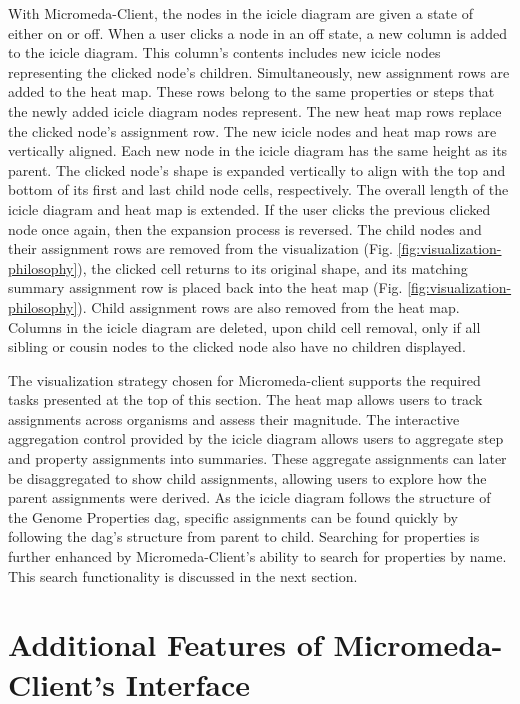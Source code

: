 With Micromeda-Client, the nodes in the icicle diagram are given a state of 
either on or off. When a user clicks a node in an off state, a new column is 
added to the icicle diagram. This column's contents includes new icicle nodes 
representing the clicked node's children. Simultaneously, new assignment rows 
are added to the heat map. These rows belong to the same properties or steps 
that the newly added icicle diagram nodes represent. The new heat map rows 
replace the clicked node's assignment row. The new icicle nodes and heat map 
rows are vertically aligned. Each new node in the icicle diagram has the same 
height as its parent. The clicked node's shape is expanded vertically to align 
with the top and bottom of its first and last child node cells, respectively. 
The overall length of the icicle diagram and heat map is extended. If the user 
clicks the previous clicked node once again, then the expansion process 
is reversed. The child nodes and their assignment rows are removed from the 
visualization (Fig. \ref{fig:visualization-philosophy}), the clicked cell 
returns to its original shape, and its matching summary assignment row is placed 
back into the heat map (Fig. \ref{fig:visualization-philosophy}). Child 
assignment rows are also removed from the heat map. Columns in the icicle 
diagram are deleted, upon child cell removal, only if all sibling or cousin 
nodes to the clicked node also have no children displayed.

The visualization strategy chosen for Micromeda-client supports the required 
tasks presented at the top of this section. The heat map allows users to track 
assignments across organisms and assess their magnitude. The interactive 
aggregation control provided by the icicle diagram allows users to aggregate 
step and property assignments into summaries. These aggregate assignments can 
later be disaggregated to show child assignments, allowing users to explore how 
the parent assignments were derived. As the icicle diagram follows the structure 
of the Genome Properties \gls{dag}, specific assignments can be found quickly by 
following the \gls{dag}'s structure from parent to child. Searching for 
properties is further enhanced by Micromeda-Client's ability to search for 
properties by name. This search functionality is discussed in the next section.

\section{Additional Features of Micromeda-Client's Interface} 
\label{client-additional-features}

